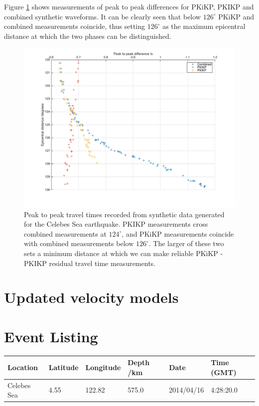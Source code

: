 \documentclass[11pt,a4paper]{article}
\begin{document}
Figure \ref{fig:Min distance} shows measurements of peak to peak differences for PKiKP, PKIKP and combined synthetic waveforms. It can be clearly seen that below $126^{\circ}$ PKiKP and combined measurements coincide, thus setting $126^{\circ}$ as the maximum epicentral distance at which the two phases can be distinguished.

\begin{figure}
	\centering
	\includegraphics[width=\textwidth]{figures/min_distance}
	\caption{Peak to peak travel times recorded from synthetic data generated for the Celebes Sea earthquake. PKIKP measurements cross combined measurements at $124^{\circ}$, and PKiKP measurements coincide with combined measurements below $126^{\circ}$. The larger of these two sets a minimum distance at which we can make reliable PKiKP - PKIKP residual travel time measurements.}
	\label{fig:Min distance}
\end{figure}

\section{Updated velocity models}
\label{sec:Models}

\appendix
\section{Event Listing}
\label{App:Event listing}
\begin{tabular}{| l | l | l | l | l | l |}
	\hline Location		& Latitude	& Longitude	& Depth /km	& Date		& Time (GMT) \\
	\hline Celebes Sea	& 4.55	& 122.82		& 575.0		& 2014/04/16	& 4:28:20.0 \\ 
	\hline
\end{tabular}



\end{document}
